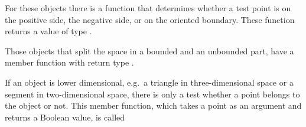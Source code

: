 For these objects there is a function  that
determines whether a test point is on the positive side, the negative
side, or on the oriented boundary. These function returns a value of type
.

Those objects that split the space in a bounded and an unbounded part, have
a member function  with return type
.

If an object is lower dimensional, e.g.\ a triangle in three-dimensional
space or a segment in two-dimensional space, there is only a test whether a
point belongs to the object or not. This member function, which takes a 
point as an argument and returns a Boolean value, is called 
